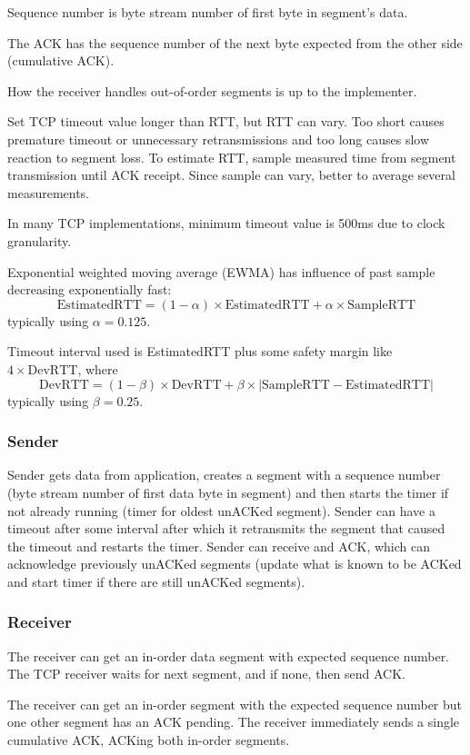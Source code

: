 \documentclass[11pt]{article}
\begin{document}
Sequence number is byte stream number of first byte in segment's data.

The ACK has the sequence number of the next byte expected from the other side (cumulative ACK).

How the receiver handles out-of-order segments is up to the implementer.

Set TCP timeout value longer than RTT, but RTT can vary. Too short causes premature timeout or
unnecessary retransmissions and too long causes slow reaction to segment loss.
To estimate RTT, sample measured time from segment transmission until ACK receipt.
Since sample can vary, better to average several measurements.

In many TCP implementations, minimum timeout value is 500ms due to clock granularity.

Exponential weighted moving average (EWMA) has influence of past sample decreasing exponentially
fast:
$$ \text{EstimatedRTT} = (1 - \alpha) \times \text{EstimatedRTT} + \alpha \times \text{SampleRTT} $$
typically using \(\alpha = 0.125\).

Timeout interval used is EstimatedRTT plus some safety margin like \(4 \times \text{DevRTT}\),
where
$$ \text{DevRTT} = (1 - \beta) \times \text{DevRTT} + \beta \times \left| \text{SampleRTT} - \text{EstimatedRTT} \right| $$
typically using \(\beta = 0.25\).
\subsubsection{Sender}
\label{sec:org05e15f9}
Sender gets data from application, creates a segment with a sequence number (byte stream number
of first data byte in segment) and then starts the timer if not already running (timer for oldest
unACKed segment).
Sender can have a timeout after some interval after which it retransmits the segment that caused
the timeout and restarts the timer.
Sender can receive and ACK, which can acknowledge previously unACKed segments (update what is
known to be ACKed and start timer if there are still unACKed segments).
\subsubsection{Receiver}
\label{sec:org555eff8}
The receiver can get an in-order data segment with expected sequence number.
The TCP receiver waits for next segment, and if none, then send ACK.

The receiver can get an in-order segment with the expected sequence number but one other
segment has an ACK pending.
The receiver immediately sends a single cumulative ACK, ACKing both in-order segments.
\end{document}
